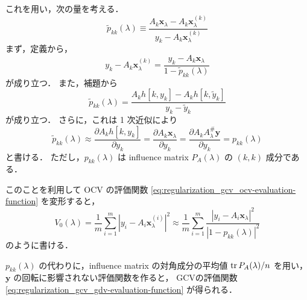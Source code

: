 これを用い，次の量を考える．
\begin{equation}
    \tilde{p}_{kk}(\lambda)
    \equiv \frac{A_k \bm{x}_\lambda - A_k \bm{x}_\lambda^{(k)}}
    {y_k - A_k \bm{x}_\lambda^{(k)}}
\end{equation}
まず，定義から，
\begin{equation}
    y_k - A_k \bm{x}_\lambda^{(k)} =
    \frac{y_k - A_k \bm{x}_\lambda}{1 - \tilde{p}_{kk}(\lambda)}
\end{equation}
が成り立つ．
また，補題から
\begin{equation}
    \tilde{p}_{kk}(\lambda)
    = \frac{A_k h[k,y_k] - A_k h[k,\tilde{y}_k]}{y_k - \tilde{y}_k}
\end{equation}
が成り立つ．
さらに，これは 1 次近似により
\begin{equation}
    \tilde{p}_{kk}(\lambda)
    \approx \frac{\partial A_k h[k,y_k]}{\partial y_k}
    =\frac{\partial A_k \bm{x}_\lambda}{\partial y_k}
    =\frac{\partial A_k A_\lambda^\# \bm{y}}{\partial y_k}
    =p_{kk}(\lambda)
\end{equation}
と書ける．
ただし，$p_{kk}(\lambda)$ は
influence matrix $P_A(\lambda)$ の $(k,k)$ 成分である．

このことを利用して OCV の評価関数
\eqref{eq:regularization_gcv_ocv-evaluation-function}
を変形すると，
\begin{equation}
    V_0(\lambda)=
    \frac{1}{m} \sum_{i=1}^m
    \left|y_i - A_i \bm{x}_\lambda^{(i)}\right|^2
    \approx
    \frac{1}{m} \sum_{i=1}^m
    \frac{\left|y_i - A_i \bm{x}_\lambda\right|^2}
    {\left|1 - p_{kk}(\lambda)\right|^2}
\end{equation}
のように書ける．

$p_{kk}(\lambda)$
の代わりに，influence matrix の対角成分の平均値
$\operatorname{tr} P_A(\lambda)/n$
を用い，
$\bm{y}$
の回転に影響されない評価関数を作ると，
GCVの評価関数 \eqref{eq:regularization_gcv_gdv-evaluation-function} が得られる．
